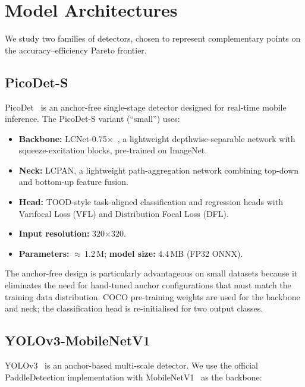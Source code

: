 \section{Model Architectures}
\label{sec:methodology}

We study two families of detectors, chosen to represent complementary
points on the accuracy--efficiency Pareto frontier.

\subsection{PicoDet-S}

PicoDet~\citep{yu2021picodet} is an anchor-free single-stage detector
designed for real-time mobile inference.  The PicoDet-S variant
(``small'') uses:

\begin{itemize}[leftmargin=1.5em]
  \item \textbf{Backbone:} LCNet-0.75$\times$~\citep{cui2021pp},
    a lightweight depthwise-separable network with squeeze-excitation
    blocks, pre-trained on ImageNet.
  \item \textbf{Neck:} LCPAN, a lightweight path-aggregation network
    combining top-down and bottom-up feature fusion.
  \item \textbf{Head:} TOOD-style task-aligned classification and
    regression heads with Varifocal Loss (VFL) and Distribution Focal
    Loss (DFL).
  \item \textbf{Input resolution:} 320$\times$320.
  \item \textbf{Parameters:} $\approx$\,1.2\,M; \textbf{model size:}
    4.4\,MB (FP32 ONNX).
\end{itemize}

The anchor-free design is particularly advantageous on small datasets
because it eliminates the need for hand-tuned anchor configurations
that must match the training data distribution.
COCO pre-training weights are used for the backbone and neck; the
classification head is re-initialised for two output classes.

\subsection{YOLOv3-MobileNetV1}

YOLOv3~\citep{redmon2018yolov3} is an anchor-based multi-scale detector.
We use the official PaddleDetection implementation with
MobileNetV1~\citep{howard2017mobilenets} as the backbone:

